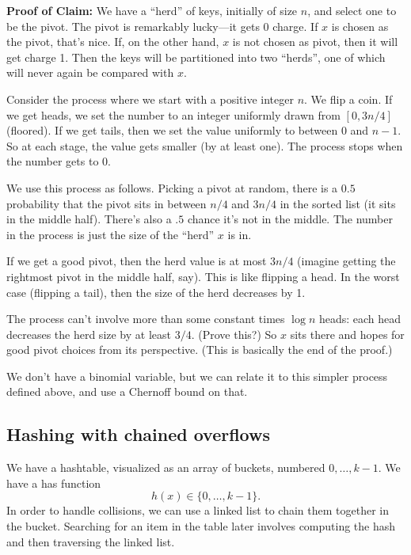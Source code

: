 \documentclass{article}
\begin{document}
\textbf{Proof of Claim:}
We have a ``herd'' of keys, initially of size $n$, and select one to be the pivot.
The pivot is remarkably lucky---it gets 0 charge.
If $x$ is chosen as the pivot, that's nice.
If, on the other hand, $x$ is not chosen as pivot, then it will get charge 1.
Then the keys will be partitioned into two ``herds'', one of which will
never again be compared with $x$.

Consider the process where we start with a positive integer $n$.
We flip a coin. 
If we get heads, we set the number to an integer uniformly drawn from
$[0, 3n/4]$ (floored).
If we get tails, then we set the value uniformly to between $0$ and $n - 1$.
So at each stage, the value gets smaller (by at least one).
The process stops when the number gets to 0.

We use this process as follows. 
Picking a pivot at random,
there is a $0.5$ probability that the pivot sits in between $n/4$ and $3n/4$ in the sorted list (it sits in the middle half).
There's also a $.5$ chance it's not in the middle.
The number in the process is just the size of the ``herd'' $x$ is in.

If we get a good pivot, then the herd value is at most $3n/4$ (imagine
getting the rightmost pivot in the middle half, say).
This is like flipping a head.
In the worst case (flipping a tail), then the size of the herd decreases by 1.

The process can't involve more than some constant times $\log n$ heads:
each head decreases the herd size by at least $3/4$.
(Prove this?)
So $x$ sits there and hopes for good pivot choices from its perspective.
(This is basically the end of the proof.)

We don't have a binomial variable, but we can relate it to this
simpler process defined above, and use a Chernoff bound on that.


\subsection{Hashing with chained overflows}

We have a hashtable, visualized as an array of buckets, numbered $0,\ldots,k-1$.
We have a has function
$$
h(x) \in \{0,\ldots,k-1\}.
$$
In order to handle collisions, we can use a linked list to chain
them together in the bucket.
Searching for an item in the table later involves computing the hash and
then traversing the linked list.
\end{document}
